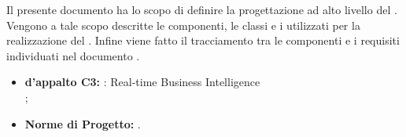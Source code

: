 
		Il presente documento ha lo scopo di definire la progettazione ad alto livello del  \projectname{}.\\
		Vengono a tale scopo descritte le componenti, le classi e i  utilizzati per la realizzazione del . Infine viene fatto il tracciamento tra le componenti e i requisiti individuati nel documento .

	

		\begin{itemize}
			\item\textbf{ d'appalto C3:} \projectname{}: Real-time Business Intelligence \\
				;
			\item \textbf{Norme di Progetto:} .
		\end{itemize}
